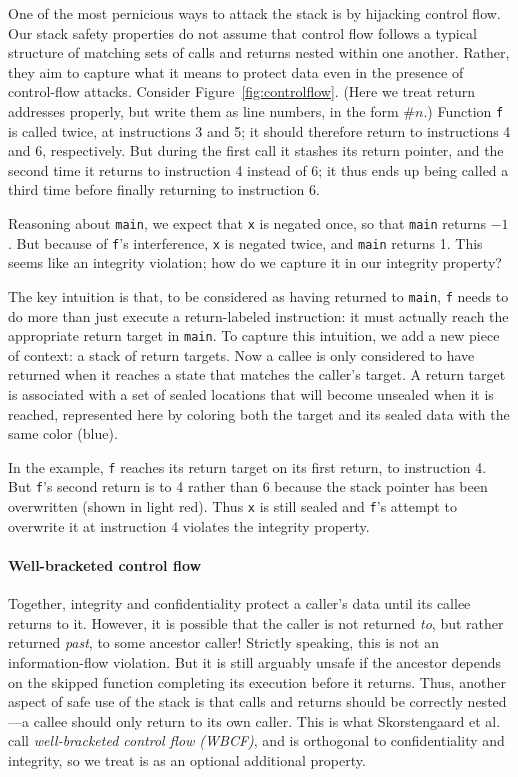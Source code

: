 \documentclass[10pt,conference]{ieeetran}%
\theoremstyle{definition}
\begin{document}
One of the most pernicious ways to attack the stack is by hijacking control flow.
Our stack safety properties do not assume that control flow follows a typical structure
of matching sets of calls and returns nested within one another.
Rather, they aim to capture what it means to protect data even in the presence of control-flow attacks.
Consider Figure~\ref{fig:controlflow}.
(Here we treat return addresses properly, but write them as line numbers, in the
form $\#n$.)
Function {\tt f} is called twice, at instructions 3 and 5; it should therefore return to instructions
4 and 6, respectively. But during the first call it stashes its
return pointer, and the second time it returns to instruction 4 instead of 6; it thus ends
up being called a third time before finally returning to instruction 6.

Reasoning about {\tt main}, we expect that {\tt x} is negated once, so that {\tt main} returns
$-1$. But because of {\tt f}'s interference, {\tt x} is negated twice, and {\tt main} returns 1.
This seems like an integrity violation; how do we capture it in our
\ifspace integrity \fi property?

The key intuition is that, to be considered as having returned to {\tt main}, {\tt f} needs
to do more than just execute a return-labeled instruction: it must actually reach the
appropriate return target in {\tt main}.
To capture this intuition, we add a new piece of context:
a stack of return targets.  Now a callee is
only considered to have returned when it reaches a state that matches the caller's target.
A return target is associated with a set of sealed locations that will become unsealed
when it is reached, represented here by coloring both the target and its sealed data with the
same color (blue).

In the example, {\tt f} reaches its return target on its first return, to instruction 4.
But {\tt f}'s second return is to 4 rather than 6
because the stack pointer has been overwritten (shown in light red).
Thus {\tt x} is still sealed and {\tt f}'s attempt to overwrite it at instruction 4
violates the integrity property.

\paragraph*{Well-bracketed control flow} Together,
integrity and confidentiality protect a caller's data until its callee
returns to it. However, it is possible that the caller is not
returned {\em to}, but rather returned {\em past}, to some ancestor caller!
Strictly speaking, this is not an information-flow violation. But it is still
arguably unsafe if the ancestor depends on the skipped function completing its execution before
it returns.
%
Thus, another aspect of safe use of the stack is that calls
and returns should be correctly nested---a callee should
only return to its own caller.  This is what Skorstengaard et al.\cite{SkorstengaardSTKJFP}
call \emph{well-bracketed control flow (WBCF)}, and is orthogonal to
confidentiality and integrity, so we treat is as an optional additional property.
\end{document}
